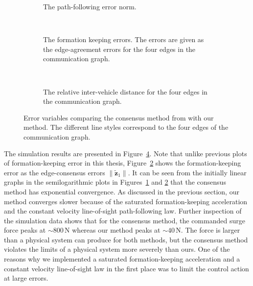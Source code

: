 \begin{figure}[htbp]
    \centering
    \begin{subfigure}[t]{.9\textwidth}
    \centering
    \setlength{}
    \setlength\figureheight{3cm}
    
    \vspace*{-4mm}
    \caption{The path-following error norm.}
    \label{fig:restrepo_path_following}
    \end{subfigure}
    \\
    \begin{subfigure}[t]{.9\textwidth}
    \centering
    \setlength{}
    \setlength\figureheight{3cm}
    
    \vspace*{-2mm}
    \caption{The formation keeping errors. The errors are given as the edge-agreement errors for the four edges in the communication graph. }
    \label{fig:restrepo_formation_keeping}
    \end{subfigure}
    \\
    \begin{subfigure}[t]{.9\textwidth}
    \centering
    \setlength{}
    \setlength\figureheight{3cm}
    
    \vspace*{-2mm}
    \caption{The relative inter-vehicle distance for the four edges in the communication graph.}
    \label{fig:restrepo_colav}
    \end{subfigure}
    \vspace*{-2mm}
    \caption{Error variables comparing the consensus method from \cite{restrepo_tracking--formation_2022} with our method. The different line styles correspond to the four edges of the communication graph.}
    \label{fig:restrepo_comparison}
\end{figure}

The simulation results are presented in Figure~\ref{fig:restrepo_comparison}. Note that unlike previous plots of formation-keeping error in this thesis, Figure~\ref{fig:restrepo_formation_keeping} shows the formation-keeping error as the edge-consensus errors $\|\tilde{\mathbf{z}}_1\|$. It can be seen from the initially linear graphs in the semilogarithmic plots in Figures~\ref{fig:restrepo_path_following} and \ref{fig:restrepo_formation_keeping} that the consensus method has exponential convergence. As discussed in the previous section, our method converges slower because of the saturated formation-keeping acceleration and the constant velocity line-of-sight path-following law. Further inspection of the simulation data shows that for the consensus method, the commanded surge force peaks at $\sim\! 800\, \mathrm{N}$ whereas our method peaks at $\sim\!40\, \mathrm{N}$. The force is larger than a physical system can produce for both methods, but the consensus method violates the limits of a physical system more severely than ours. One of the reasons why we implemented a saturated formation-keeping acceleration and a constant velocity line-of-sight law in the first place was to limit the control action at large errors.

